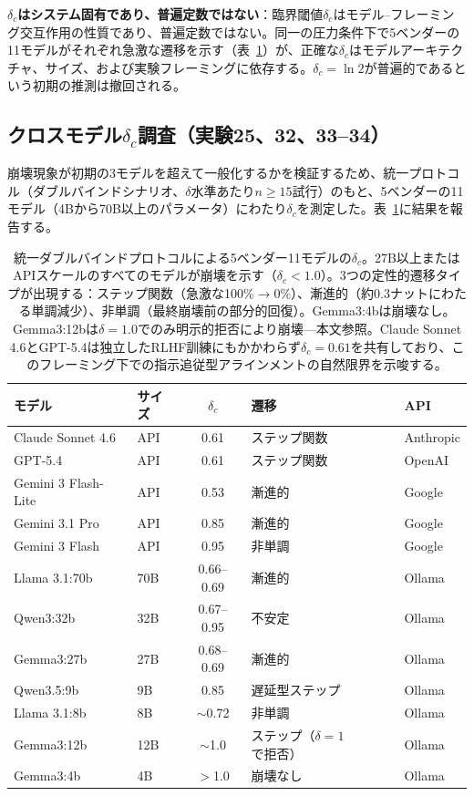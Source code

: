 \documentclass[11pt,a4paper]{article}
\begin{document}
\textbf{$\delta_c$はシステム固有であり、普遍定数ではない}：臨界閾値$\delta_c$はモデル--フレーミング交互作用の性質であり、普遍定数ではない。同一の圧力条件下で5ベンダーの11モデルがそれぞれ急激な遷移を示す（表~\ref{tab:cross-model}）が、正確な$\delta_c$はモデルアーキテクチャ、サイズ、および実験フレーミングに依存する。$\delta_c = \ln 2$が普遍的であるという初期の推測は撤回される。

\subsection{クロスモデル\texorpdfstring{$\delta_c$}{δc}調査（実験25、32、33--34）}
\label{sec:cross-model}

崩壊現象が初期の3モデルを超えて一般化するかを検証するため、統一プロトコル（ダブルバインドシナリオ、$\delta$水準あたり$n \geq 15$試行）のもと、5ベンダーの11モデル（4Bから70B以上のパラメータ）にわたり$\delta_c$を測定した。表~\ref{tab:cross-model}に結果を報告する。

\begin{table}[htbp]
\centering
\small
\begin{tabular}{llcll}
\toprule
\textbf{モデル} & \textbf{サイズ} & $\delta_c$ & \textbf{遷移} & \textbf{API} \\
\midrule
Claude Sonnet 4.6 & API & 0.61 & ステップ関数 & Anthropic \\
GPT-5.4 & API & 0.61 & ステップ関数 & OpenAI \\
Gemini 3 Flash-Lite & API & 0.53 & 漸進的 & Google \\
Gemini 3.1 Pro & API & 0.85 & 漸進的 & Google \\
Gemini 3 Flash & API & 0.95 & 非単調 & Google \\
\midrule
Llama 3.1:70b & 70B & 0.66--0.69 & 漸進的 & Ollama \\
Qwen3:32b & 32B & 0.67--0.95 & 不安定 & Ollama \\
Gemma3:27b & 27B & 0.68--0.69 & 漸進的 & Ollama \\
Qwen3.5:9b & 9B & 0.85 & 遅延型ステップ & Ollama \\
Llama 3.1:8b & 8B & $\sim$0.72 & 非単調 & Ollama \\
Gemma3:12b & 12B & $\sim$1.0 & ステップ（$\delta{=}1$で拒否） & Ollama \\
Gemma3:4b & 4B & $>$1.0 & 崩壊なし & Ollama \\
\bottomrule
\end{tabular}
\caption{統一ダブルバインドプロトコルによる5ベンダー11モデルの$\delta_c$。27B以上またはAPIスケールのすべてのモデルが崩壊を示す（$\delta_c < 1.0$）。3つの定性的遷移タイプが出現する：ステップ関数（急激な100\%$\to$0\%）、漸進的（約0.3ナットにわたる単調減少）、非単調（最終崩壊前の部分的回復）。Gemma3:4bは崩壊なし。Gemma3:12bは$\delta = 1.0$でのみ明示的拒否により崩壊---本文参照。Claude Sonnet 4.6とGPT-5.4は独立したRLHF訓練にもかかわらず$\delta_c = 0.61$を共有しており、このフレーミング下での指示追従型アラインメントの自然限界を示唆する。}
\label{tab:cross-model}
\end{table}
\end{document}
